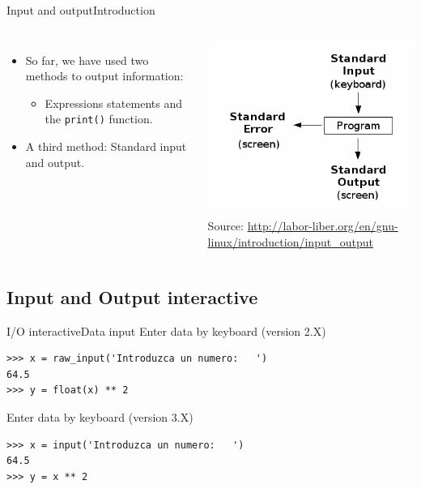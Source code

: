 \documentclass[10pt,compress]{beamer} %
\begin{document}
\begin{frame}[fragile]{Input and output}{Introduction}
    \begin{columns}
	\begin{itemize}
		\item So far, we have used two methods to output information:
			\begin{itemize}
			\item Expressions statements and the \texttt{print()} function.
			\end{itemize}
		\item A third method: Standard input and output.\\
	\end{itemize}
  			\includegraphics[width=\textwidth]{figs/InputOutput.png}\\
			\centering \tiny{Source: \url{http://labor-liber.org/en/gnu-linux/introduction/input\_output}}
	\end{columns}
\end{frame}

\subsection{Input and Output interactive}


\begin{frame}[fragile]{I/O interactive}{Data input}
Enter data  by keyboard  (version 2.X)
\begin{verbatim}
>>> x = raw_input('Introduzca un numero:   ')
64.5
>>> y = float(x) ** 2
\end{verbatim}	
	Enter data  by keyboard  (version 3.X)
\begin{verbatim}	
>>> x = input('Introduzca un numero:   ')
64.5
>>> y = x ** 2
\end{verbatim}
\end{frame}
\end{document}
